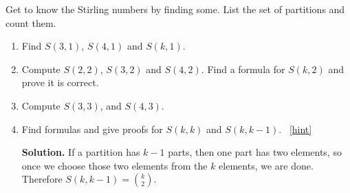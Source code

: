 \documentclass{book}
\begin{document}
\setcounter{project}{198}
\addtocounter{project}{-1}
\begin{activity}[]\label{act_stirlingcomputations}
\hypertarget{p-1143}{}%
Get to know the Stirling numbers by finding some.  List the set of partitions and count them.%
\begin{enumerate}[font=\bfseries,label=(\alph*),ref=\alph*]
\item\label{task-210} \hypertarget{p-1144}{}%
Find \(S(3,1)\), \(S(4,1)\) and \(S(k,1)\).%
\item\label{task-211} \hypertarget{p-1145}{}%
Compute \(S(2,2)\), \(S(3,2)\) and \(S(4,2)\).  Find a formula for \(S(k,2)\) and prove it is correct.%
\item\label{task-212} \hypertarget{p-1146}{}%
Compute \(S(3,3)\), and \(S(4,3)\).%
\item\label{task-213} \hypertarget{p-1147}{}%
Find formulas and give proofs for \(S(k,k)\) and \(S(k,k - 1)\).%
~\hfill{\tiny\hyperlink{a-198.d}{[hint]}\hypertarget{q-198.d}{}}\par\smallskip%
\noindent\textbf{Solution.}\hypertarget{solution-123}{}\quad%
\hypertarget{p-1149}{}%
If a partition has \(k-1\) parts, then one part has two elements, so once we choose those two elements from the \(k\) elements, we are done.  Therefore \(S(k,k-1) = \binom{k}{2}\).%
\end{enumerate}
\end{activity}
\end{document}
